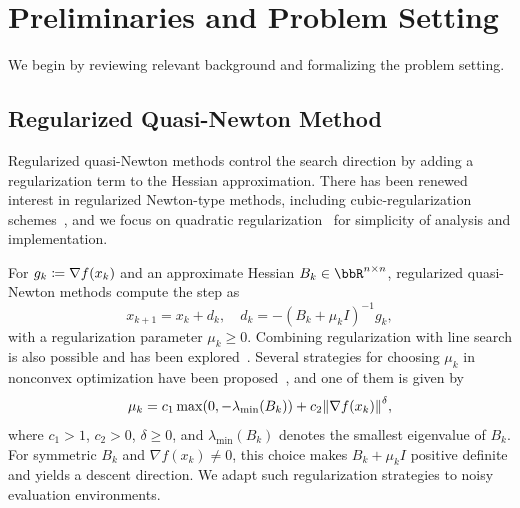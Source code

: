 \documentclass[journal_revised_MPC]{subfiles}
\begin{document}
\providecommand{\resultsNoiseMainWidth}{0.9}
\providecommand{\resultsNoiseLegendWidth}{0.8}
\providecommand{\resultsAllPrecisionsSubfigWidth}{0.32}

\section{Preliminaries and Problem Setting}
\label{sec:preliminaries}

We begin by reviewing relevant background and formalizing the problem setting.

\subsection{Regularized Quasi-Newton Method}
\label{sec:prel_rqn}

Regularized quasi-Newton methods control the search direction by adding a regularization term to the Hessian approximation.
There has been renewed interest in regularized Newton-type methods, including cubic-regularization schemes~\citep{nesterovCubicRegularizationNewton2006,ranganathSymmetricRankOneQuasiNewton2025,wangConvergenceRatesRegularized2025}, and we focus on quadratic regularization~\citep{kanzowRegularizationLimitedMemory2023,doikovSuperUniversalRegularizedNewton2024,liTruncatedRegularizedNewton2009,zhangNewRegularizedQuasiNewton2018,uedaConvergencePropertiesRegularized2010,uedaRegularizedNewtonMethod2014,shengNewAdaptiveTrust2018} for simplicity of analysis and implementation.

For $g_k \coloneqq \nabla f(x_k)$ and an approximate Hessian $B_k \in \bbR^{n \times n}$, regularized quasi-Newton methods compute the step as
\begin{equation*}
    x_{k+1} = x_k + d_k, \quad d_k = -(B_k + \mu_k I)^{-1} g_k,
\end{equation*}
with a regularization parameter $\mu_k \ge 0$.
Combining regularization with line search is also possible and has been explored~\citep{uedaConvergencePropertiesRegularized2010}.
Several strategies for choosing $\mu_k$ in nonconvex optimization have been proposed~\citep{uedaConvergencePropertiesRegularized2010,uedaRegularizedNewtonMethod2014,shengNewAdaptiveTrust2018}, and one of them is given by
\begin{equation*}
    \mu_k = c_1 \max(0, -\lambda_{\min}(B_k)) + c_2 \norm{\nabla f(x_k)}^\delta,
\end{equation*}
where $c_1 > 1$, $c_2 > 0$, $\delta \ge 0$, and $\lambda_{\min}(B_k)$ denotes the smallest eigenvalue of $B_k$.
For symmetric $B_k$ and $\nabla f(x_k) \neq 0$, this choice makes $B_k + \mu_k I$ positive definite and yields a descent direction.
We adapt such regularization strategies to noisy evaluation environments.
\end{document}
